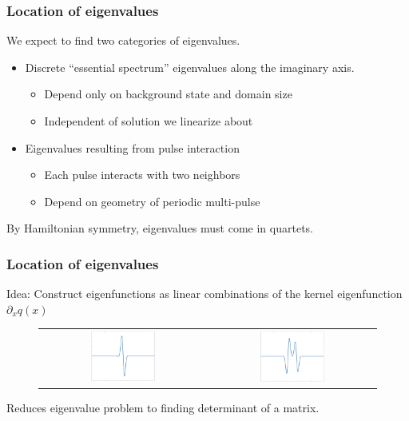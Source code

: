\documentclass[16pt]{beamer}
\begin{document}
\begin{frame}
	\frametitle{Location of eigenvalues}
	\fontsize{16}{7.2}\selectfont
	We expect to find two categories of eigenvalues.

	\begin{itemize}
		\item Discrete ``essential spectrum'' eigenvalues along the imaginary axis.
		\begin{itemize}
			\item Depend only on background state and domain size
			\item Independent of solution we linearize about
		\end{itemize}
		\item Eigenvalues resulting from pulse interaction 
		\begin{itemize}
			\item Each pulse interacts with two neighbors
			\item Depend on geometry of periodic multi-pulse
		\end{itemize}
	\end{itemize}
	\vspace{0.5cm}

	By Hamiltonian symmetry, eigenvalues must come in quartets.
\end{frame}

\begin{frame}
	\frametitle{Location of eigenvalues}
	\fontsize{16}{7.2}\selectfont
	Idea: Construct eigenfunctions as linear combinations of the kernel eigenfunction $\partial_x q(x)$
	\begin{figure}
	\begin{center}
	\begin{tabular}{cc}
	\includegraphics[width=0.4\textwidth]{images/kerneleig} & 
	\includegraphics[width=0.4\textwidth]{images/DP1eig} \\
	\end{tabular}
	\end{center}
	\end{figure}
	Reduces eigenvalue problem to finding determinant of a matrix.
\end{frame}
\end{document}
